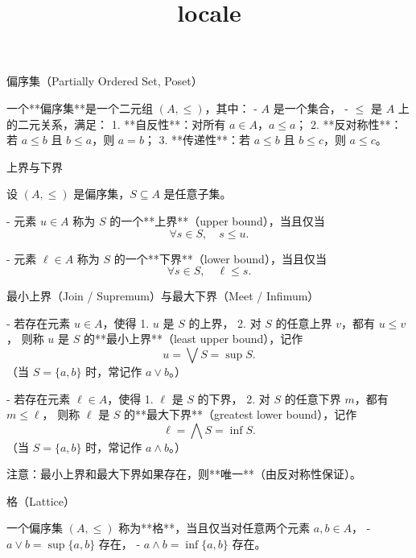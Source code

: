 \documentclass{beamer}
\title{locale}
\date{}
\begin{document}
\begin{frame}
    \titlepage
\end{frame}

\begin{frame}[fragile]{偏序集（Partially Ordered Set, Poset）}
\begin{markdown}
一个**偏序集**是一个二元组 $(A,\leq)$，其中：
- $A$ 是一个集合，
- $\leq$ 是 $A$ 上的二元关系，满足：
  1. **自反性**：对所有 $a\in A$，$a\leq a$；
  2. **反对称性**：若 $a\leq b$ 且 $b\leq a$，则 $a=b$；
  3. **传递性**：若 $a\leq b$ 且 $b\leq c$，则 $a\leq c$。
\end{markdown}
\end{frame}

\begin{frame}[fragile]{上界与下界}
\begin{markdown}
设 $(A,\leq)$ 是偏序集，$S\subseteq A$ 是任意子集。

- 元素 $u\in A$ 称为 $S$ 的一个**上界**（upper bound），当且仅当
  $$
  \forall s\in S,\quad s\leq u.
  $$

- 元素 $\ell\in A$ 称为 $S$ 的一个**下界**（lower bound），当且仅当
  $$
  \forall s\in S,\quad \ell\leq s.
  $$
\end{markdown}
\end{frame}

\begin{frame}[fragile]{最小上界（Join / Supremum）与最大下界（Meet / Infimum）}
\begin{markdown}
- 若存在元素 $u\in A$，使得
  1. $u$ 是 $S$ 的上界，
  2. 对 $S$ 的任意上界 $v$，都有 $u\leq v$，
  则称 $u$ 是 $S$ 的**最小上界**（least upper bound），记作
  $$
  u = \bigvee S = \sup S.
  $$
  （当 $S=\{a,b\}$ 时，常记作 $a\vee b$。）

- 若存在元素 $\ell\in A$，使得
  1. $\ell$ 是 $S$ 的下界，
  2. 对 $S$ 的任意下界 $m$，都有 $m\leq \ell$，
  则称 $\ell$ 是 $S$ 的**最大下界**（greatest lower bound），记作
  $$
  \ell = \bigwedge S = \inf S.
  $$
  （当 $S=\{a,b\}$ 时，常记作 $a\wedge b$。）

注意：最小上界和最大下界如果存在，则**唯一**（由反对称性保证）。
\end{markdown}
\end{frame}

\begin{frame}[fragile]{格（Lattice）}
\begin{markdown}
一个偏序集 $(A,\leq)$ 称为**格**，当且仅当对任意两个元素 $a,b\in A$，
- $a\vee b = \sup\{a,b\}$ 存在，
- $a\wedge b = \inf\{a,b\}$ 存在。
\end{markdown}
\end{frame}
\end{document}
